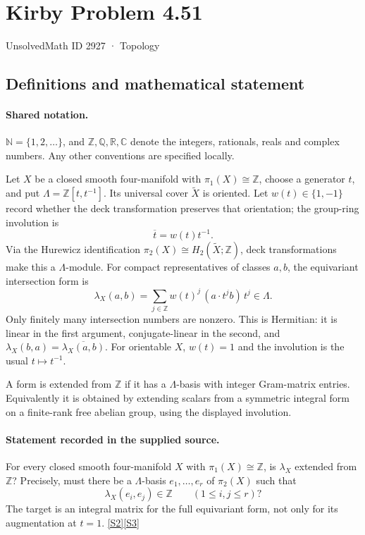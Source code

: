 \documentclass[11pt]{article}
\newcommand{\sref}[2]{\hyperlink{source:#1:#2}{[S#2]}}
\begin{document}
\setcounter{section}{2926}
\section{Kirby Problem 4.51}\label{2927}
{\small\sffamily UnsolvedMath ID 2927 · Topology}
\subsection{Definitions and mathematical statement}

\paragraph{Shared notation.}$\mathbb N=\{1,2,\ldots\}$, and $\mathbb Z,\mathbb Q,\mathbb R,\mathbb C$ denote the integers, rationals, reals and complex numbers. Any other conventions are specified locally.


Let $X$ be a closed smooth four-manifold with $\pi_1(X)\cong\mathbb Z$, choose a generator $t$, and put $\Lambda=\mathbb Z[t,t^{-1}]$. Its universal cover $\widetilde X$ is oriented. Let $w(t)\in\{1,-1\}$ record whether the deck transformation preserves that orientation; the group-ring involution is
\[
\overline{t}=w(t)t^{-1}.
\]
Via the Hurewicz identification $\pi_2(X)\cong H_2(\widetilde X;\mathbb Z)$, deck transformations make this a $\Lambda$-module. For compact representatives of classes $a,b$, the equivariant intersection form is
\[
\lambda_X(a,b)=\sum_{j\in\mathbb Z}w(t)^j\,(a\cdot t^jb)\,t^j\in\Lambda.
\]
Only finitely many intersection numbers are nonzero. This is Hermitian: it is linear in the first argument, conjugate-linear in the second, and $\lambda_X(b,a)=\overline{\lambda_X(a,b)}$. For orientable $X$, $w(t)=1$ and the involution is the usual $t\mapsto t^{-1}$.

A form is extended from $\mathbb Z$ if it has a $\Lambda$-basis with integer Gram-matrix entries. Equivalently it is obtained by extending scalars from a symmetric integral form on a finite-rank free abelian group, using the displayed involution.
\paragraph{Statement recorded in the supplied source.}
For every closed smooth four-manifold $X$ with $\pi_1(X)\cong\mathbb Z$, is $\lambda_X$ extended from $\mathbb Z$? Precisely, must there be a $\Lambda$-basis $e_1,\ldots,e_r$ of $\pi_2(X)$ such that
\[
\lambda_X(e_i,e_j)\in\mathbb Z\qquad(1\le i,j\le r)?
\]
The target is an integral matrix for the full equivariant form, not only for its augmentation at $t=1$. \sref{2927}{2}\sref{2927}{3}
\end{document}
